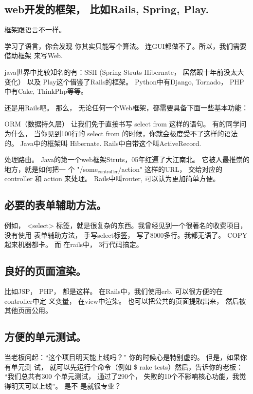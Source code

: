 \documentclass[11pt]{ctexart}
\begin{document}
{{{{\subsection{web开发的框架， 比如Rails, Spring, Play.}
\label{sec:org197e991}
框架跟语言不一样。

学习了语言，你会发现 你其实只能写个算法。 连GUI都做不了。所以，我们需要借助框架
来写Web.


java世界中比较知名的有：SSH (Spring Struts Hibernate， 居然跟十年前没太大变化）
以及 Play这个借鉴了Rails的框架。 Python中有Django, Tornado， PHP中有Cake,
ThinkPhp等等。


还是用Rails吧。 那么， 无论任何一个Web框架，都需要具备下面一些基本功能：

ORM（数据持久层）
让我们免于直接书写 select from 这样的语句。 有的同学问为什么， 当你见到100行的
select from 的时候，你就会极度受不了这样的语法的。 Java中的框架叫 Hibernate.
Rails中自带这个叫ActiveRecord.


处理路由。
Java的第一个web框架Struts，05年红遍了大江南北。 它被人最推崇的地方，就是如何把一
个 "/some\(_{\text{controller}}\)/action" 这样的URL， 交给对应的controller 和 action 来处理。
Rails中叫router, 可以认为更加简单方便。


\subsection{必要的表单辅助方法。}
\label{sec:org29ddd8f}
例如， <select> 标签，就是很复杂的东西。我曾经见到一个很著名的收费项目，没有使用
表单辅助方法， 手写select标签， 写了8000多行。我都无语了。 COPY起来机器都卡。 而
在rails中， 3行代码搞定。


\subsection{良好的页面渲染。}
\label{sec:org11e9378}
比如JSP， PHP， 都是这样。 在Rails中，我们使用erb. 可以很方便的在controller中定
义变量， 在view中渲染。 也可以把公共的页面提取出来， 然后被其他页面公用。


\subsection{方便的单元测试。}
\label{sec:orgeb174f0}
当老板问起：“这个项目明天能上线吗？” 你的时候心是特别虚的。 但是，如果你有单元测
试， 就可以先运行个命令（例如 \$ rake tests）然后，告诉你的老板： “我们总共有300
个单元测试， 通过了290个， 失败的10个不影响核心功能，我觉得明天可以上线”。 是不
是就很专业？


}}}}
\end{document}
